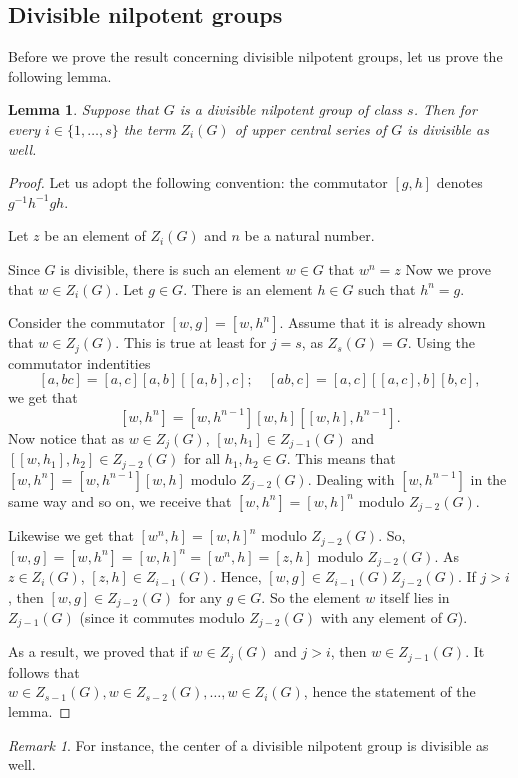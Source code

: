 \documentclass{article}
\newtheorem{lemma}{Lemma}
\theoremstyle{definition}
\theoremstyle{remark}
\newtheorem*{rem}{Remark}
\begin{document}
\subsection{Divisible nilpotent groups}

Before we prove the result concerning divisible nilpotent groups,
let us prove the following lemma.

\begin{lemma}\label{divisiblenilp}
Suppose that $G$ is a divisible nilpotent group
of class $s$.
Then for every $i\in \{1,\ldots,s\}$ the term
$Z_i(G)$ of upper central series of $G$
is divisible as well.
\end{lemma}
\begin{proof}
Let us adopt the following convention:
the commutator $[g,h]$ denotes $g^{-1}h^{-1}gh$.

Let $z$ be an element of $Z_i(G)$ and $n$ be a natural number.

Since $G$ is divisible, there is such an element $w\in G$ that $w^n=z$
Now we prove that $w \in Z_i(G)$.
Let $g \in G$. There is an element $h \in G$ such that $h^n = g$.

Consider the commutator $[w,g]=[w,h^n]$.
Assume that it is already shown that $w \in Z_j(G)$.
This is true at least for $j=s$, as $Z_s (G) = G$.
Using the commutator indentities
$$
[a,bc]=[a,c][a,b][[a,b],c];\quad [ab,c]=[a,c][[a,c],b][b,c],
$$
we get that
$$
[w,h^n] = [w,h^{n-1}] [w,h] [[w,h],h^{n-1}].
$$
Now notice that as $w \in Z_j(G)$,
$[w,h_1] \in Z_{j-1}(G)$ and $[[w,h_1],h_2] \in Z_{j-2}(G)$
for all $h_1,h_2 \in G$.
This means that $[w,h^n] = [w,h^{n-1}][w,h]$ modulo $Z_{j-2}(G)$.
Dealing with $[w,h^{n-1}]$ in the same way and so on,
we receive that $[w,h^n] = [w,h]^n$ modulo $Z_{j-2}(G)$.

Likewise we get that $[w^n,h]=[w,h]^n$
modulo $Z_{j-2}(G)$.
So,
$[w,g] = [w,h^n] = [w,h]^n = [w^n,h] = [z,h]$
modulo $Z_{j-2}(G)$.
As $z \in Z_{i}(G)$,
$[z,h] \in Z_{i-1}(G)$.
Hence,
$[w,g] \in Z_{i-1}(G)Z_{j-2}(G)$.
If $j>i$, then
$[w,g] \in Z_{j-2}(G)$ for any $g \in G$.
So the element $w$ itself lies in $Z_{j-1}(G)$
(since it commutes modulo $Z_{j-2}(G)$
with any element of $G$).

As a result, we proved that if $w \in Z_j(G)$ and $j>i$,
then $w \in Z_{j-1}(G)$.
It follows that \\
$w \in Z_{s-1}(G),w \in Z_{s-2}(G),\ldots,
w \in Z_i(G)$, hence the statement of the lemma.
\end{proof}

\begin{rem}
For instance, the center of a divisible nilpotent group is divisible as well.
\end{rem}
\end{document}
